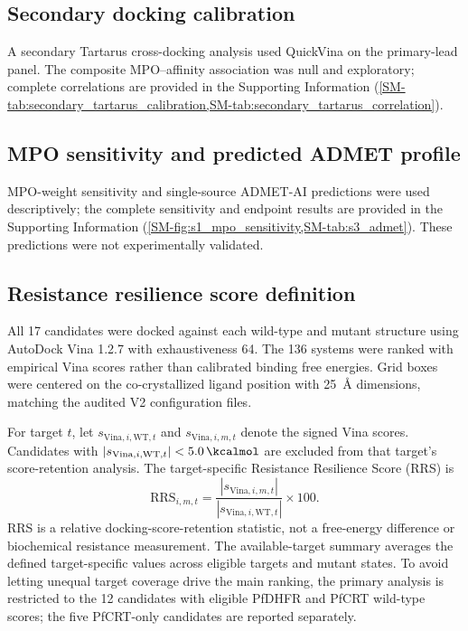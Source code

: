 \documentclass[journal=jcisd8,manuscript=article,layout=traditional]{achemso}
\begin{document}
\subsection{Secondary docking calibration}

A secondary Tartarus cross-docking analysis used QuickVina on the primary-lead panel. The composite MPO--affinity association was null and exploratory; complete correlations are provided in the Supporting Information (\cref{SM-tab:secondary_tartarus_calibration,SM-tab:secondary_tartarus_correlation}).

\subsection{MPO sensitivity and predicted ADMET profile}

MPO-weight sensitivity and single-source ADMET-AI predictions were used descriptively; the complete sensitivity and endpoint results are provided in the Supporting Information (\cref{SM-fig:s1_mpo_sensitivity,SM-tab:s3_admet}). These predictions were not experimentally validated.

\subsection{Resistance resilience score definition}\label{sec:rrs_formula}

All 17 candidates were docked against each wild-type and mutant structure using AutoDock Vina 1.2.7 with exhaustiveness \num{64}. The 136 systems were ranked with empirical Vina scores rather than calibrated binding free energies. Grid boxes were centered on the co-crystallized ligand position with \qty{25}{\angstrom} dimensions, matching the audited V2 configuration files.

For target $t$, let $s_{\mathrm{Vina},i,\mathrm{WT},t}$ and $s_{\mathrm{Vina},i,m,t}$ denote the signed Vina scores. Candidates with $|s_{\mathrm{Vina},i,\mathrm{WT},t}| < \qty{5.0}{\kcalmol}$ are excluded from that target's score-retention analysis. The target-specific Resistance Resilience Score (RRS) is
\begin{equation}
\mathrm{RRS}_{i,m,t} = \frac{|s_{\mathrm{Vina},i,m,t}|}{|s_{\mathrm{Vina},i,\mathrm{WT},t}|} \times 100.
\end{equation}
RRS is a relative docking-score-retention statistic, not a free-energy difference or biochemical resistance measurement. The available-target summary averages the defined target-specific values across eligible targets and mutant states. To avoid letting unequal target coverage drive the main ranking, the primary analysis is restricted to the 12 candidates with eligible PfDHFR and PfCRT wild-type scores; the five PfCRT-only candidates are reported separately.
\end{document}
